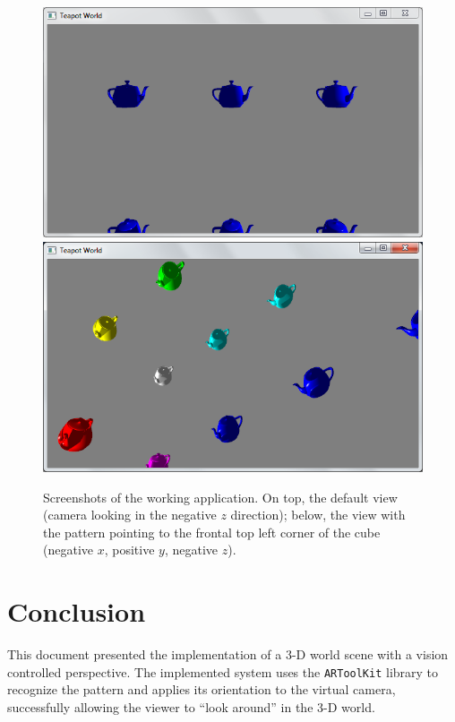 \documentclass{acmtog}
\begin{document}
\begin{figure}[!htp]
	\begin{center}
		\includegraphics[width=\columnwidth]{images/screenshot/default.png}
		\includegraphics[width=\columnwidth]{images/screenshot/ftl.png}
	\end{center}
	\caption[Application screenshots]{Screenshots of the working application. On top, the default view (camera looking in the negative $z$ direction); below, the view with the pattern pointing to the frontal top left corner of the cube (negative $x$, positive $y$, negative $z$).}
	\label{fig:screenshots}
\end{figure}

\section{Conclusion}
This document presented the implementation of a 3-D world scene with a vision controlled perspective. The implemented system uses the \texttt{ARToolKit} library to recognize the pattern and applies its orientation to the virtual camera, successfully allowing the viewer to ``look around'' in the 3-D world.
\end{document}
